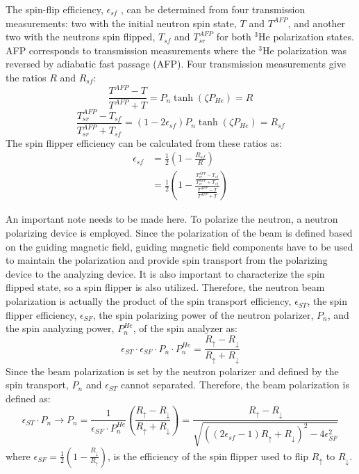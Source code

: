 The spin-flip efficiency, $\epsilon_{sf}$ , can be determined from four transmission measurements: two with the initial neutron spin state, $T$ and $T^{AFP}$, and another two with the neutrons spin flipped, $T_{sf}$ and $T^{AFP}_{sr}$ for both $^3$He polarization states. AFP corresponds to transmission measurements where the $^3$He polarization was reversed by adiabatic fast passage (AFP). Four transmission measurements give the ratios $R$ and $R_{sf}$:
\begin{equation}
    \frac{T^{AFP}-T}{T^{AFP}+T} = P_n\tanh{\left(\zeta P_{He}\right)} = R
\end{equation}
\begin{equation}
    \frac{T^{AFP}_{sr}-T_{sf}}{T^{AFP}_{sr}+T_{sf}} = \left(1-2\epsilon_{sf}\right)P_n\tanh{\left(\zeta P_{He}\right)} = R_{sf}
\end{equation}
The spin flipper efficiency can be calculated from these ratios as:
\begin{equation}
\begin{split}
    \epsilon_{sf} & = \frac{1}{2} \left( 1 - \frac{R_{sf}}{R}  \right) \\
    & =\frac{1}{2} \left(1-\frac{\frac{T^{AFP}_{sr}-T_{sf}}{T^{AFP}_{sr}+T_{sf}}}{\frac{T^{AFP}-T}{T^{AFP}+T}}\right) 
\end{split}
\end{equation}

An important note needs to be made here. To polarize the neutron, a neutron polarizing device is employed. Since the polarization of the beam is defined based on the guiding magnetic field, guiding magnetic field components have to be used to maintain the polarization and provide spin transport from the polarizing device to the analyzing device. It is also important to characterize the spin flipped state, so a spin flipper is also utilized. Therefore, the neutron beam polarization is actually the product of the spin transport efficiency, $\epsilon_{ST}$, the spin flipper efficiency, $\epsilon_{SF}$, the spin polarizing power of the neutron polarizer, $P_{n}$, and the spin analyzing power, $P^{He}_{n}$, of the spin analyzer as:
\begin{equation}
    \epsilon_{ST} \cdot \epsilon_{SF} \cdot P_{n} \cdot P^{He}_{n} = \frac{R_{\uparrow}-R_{\downarrow}}{R_{\uparrow}+R_{\downarrow}}
\end{equation}
Since the beam polarization is set by the neutron polarizer and defined by the spin transport, $P_{n}$ and $\epsilon_{ST}$ cannot separated. Therefore, the beam polarization is defined as:
\begin{equation}
    \epsilon_{ST} \cdot P_{n} \rightarrow P_{n} = \frac {1}{ \epsilon_{SF} \cdot P^{He}_{n} } \left( \frac{R_{\uparrow} - R_{\downarrow}}{R_{\uparrow}+R_{\downarrow}}  \right) =  \frac{R_{\uparrow} - R_{\downarrow}}{ \sqrt{ \left(\left(2\epsilon_{sf}-1\right)R_\uparrow + R_\downarrow \right)^2 - 4\epsilon_{SF}^2 }  } 
\end{equation}
where $ \epsilon_{SF} = \frac{1}{2} \left(  1 - \frac{R_\downarrow}{R_\uparrow}     \right) $, is the efficiency of the spin flipper used to flip $R_\uparrow$ to $R_\downarrow$.

